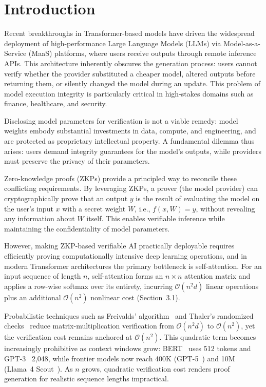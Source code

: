 \section{Introduction}
Recent breakthroughs in Transformer-based models have driven the widespread deployment of high-performance Large Language Models (LLMs) via Model-as-a-Service (MaaS) platforms, where users receive outputs through remote inference APIs. This architecture inherently obscures the generation process: users cannot verify whether the provider substituted a cheaper model, altered outputs before returning them, or silently changed the model during an update. This problem of model execution integrity is particularly critical in high-stakes domains such as finance, healthcare, and security.

Disclosing model parameters for verification is not a viable remedy: model weights embody substantial investments in data, compute, and engineering, and are protected as proprietary intellectual property. A fundamental dilemma thus arises: users demand integrity guarantees for the model's outputs, while providers must preserve the privacy of their parameters.

Zero-knowledge proofs (ZKPs) provide a principled way to reconcile these conflicting requirements. By leveraging ZKPs, a prover (the model provider) can cryptographically prove that an output $y$ is the result of evaluating the model on the user's input $x$ with a secret weight $W$, i.e., $f(x, W) = y$, without revealing any information about $W$ itself. This enables verifiable inference while maintaining the confidentiality of model parameters.

However, making ZKP-based verifiable AI practically deployable requires efficiently proving computationally intensive deep learning operations, and in modern Transformer architectures the primary bottleneck is self-attention. For an input sequence of length $n$, self-attention forms an $n \times n$ attention matrix and applies a row-wise softmax over its entirety, incurring $\mathcal{O}(n^2 d)$ linear operations plus an additional $\mathcal{O}(n^2)$ nonlinear cost (Section~3.1).

Probabilistic techniques such as Freivalds' algorithm~\cite{Freivalds} and Thaler's randomized checks~\cite{Thaler} reduce matrix-multiplication verification from $\mathcal{O}(n^2 d)$ to $\mathcal{O}(n^2)$, yet the verification cost remains anchored at $\mathcal{O}(n^2)$. This quadratic term becomes increasingly prohibitive as context windows grow: BERT~\cite{BERT} uses 512 tokens and GPT-3~\cite{GPT3} 2,048, while frontier models now reach 400K (GPT-5~\cite{GPT5}) and 10M (Llama~4 Scout~\cite{llama4}). As $n$ grows, quadratic verification cost renders proof generation for realistic sequence lengths impractical.

